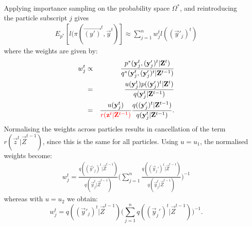 Applying importance sampling on the probability space $\Omega^*$, and reintroducing the particle subscript $j$ gives
\begin{align*}
    E_{p^*}[l(\pi (\vec{(y')}^{t}, \vec{y}^{t})] 
    \approx \sum_{j=1}^n  w^{t}_j l((\vec{y}'_j)^{t})
\end{align*}
where the weights are given by:
\begin{eqnarray*}
    w^{t}_j &\propto& \frac{p^*(\vec{y}_j^{t}, (\vec{y}_j')^{t} | \vec{Z}^{t})} {q^*(\vec{y}_j^{t}, (\vec{y}_j')^{t} |\vec{Z}^{t-1})} \\
    &=& \frac{u(\vec{y}_j^{t}) p((\vec{y}'_j)^{t} | \vec{Z}^{t})}{q(\vec{y}_j^{t} | \vec{Z}^{t-1})} \\
    &=& \frac{u(\vec{y}_j^{t})}{{\color{red}r(\vec{z}^{t} | \vec{Z}^{t-1})}} \frac{q((\vec{y}_j')^{t} | \vec{Z}^{t-1})}{q(\vec{y}_j^{t} | \vec{Z}^{t-1})}.
\end{eqnarray*}
Normalising the weights across particles results in cancellation of the term $r(\vec{z}^{t} | \vec{Z}^{t-1})$, since this is the same for all particles. Using $u = u_1$, the normalised weights become:
\begin{multline*}
    w_j^{t} = \frac{q((\vec{y}'_j)^{t} | \vec{Z}^{t-1}) }{q(\vec{y}^{t}_j | \vec{Z}^{t-1})}\Bigg( \sum_{j=1}^n  \frac{q((\vec{y}_j')^{t} | \vec{Z}^{t-1}) }{q(\vec{y}^{t}_j | \vec{Z}^{t-1})}\Bigg)^{-1} 
\end{multline*}
whereas with $u = u_2$ we obtain:
\[
    w_j^{t} = q((\vec{y}'_j)^{t} | \vec{Z}^{t-1}) \Bigg( \sum_{j=1}^n  q((\vec{y}_j')^{t} | \vec{Z}^{t-1}) \Bigg)^{-1}.
\]



